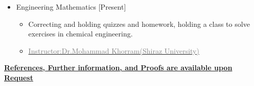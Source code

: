 \documentclass[10pt,a4paper,sans]{moderncv} %
\begin{document}
\begin{itemize}
\begin{itemize}
\begin{itemize}
			\end{itemize}
	 		
				\newline
			

       \vspace{0.5em} 
			
			\item {} Engineering Mathematics  \hfill[Present]
			\begin{itemize} 
				\item Correcting and holding quizzes and homework, holding a class to solve exercises in chemical engineering.
				\item\href{https://scholar.google.com/citations?user=swfaYtQAAAAJ&hl=en}{\textcolor{gray}{Instructor:Dr.Mohammad Khorram(Shiraz University)}}
				
			\end{itemize}


    
	\end{itemize}
	
	\end{itemize}
	
	\vspace{0.5em}
	

	
	\vspace{1.3 em}
	
	
	
	\centerline{\underline{\textbf{	\faExclamationCircle \hspace{0.5 pt} References, Further information, and Proofs are available upon Request }}}
	
\end{document}
